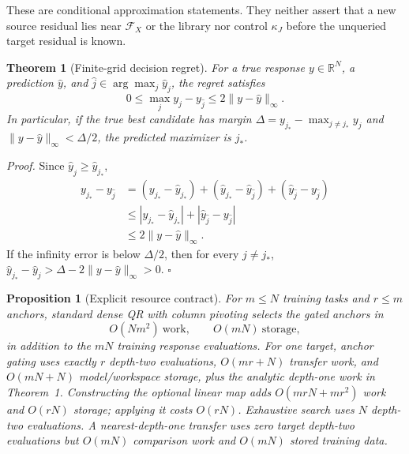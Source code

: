 \documentclass[10pt,letterpaper,twoside]{article}
\newtheorem{theorem}{Theorem}
\newtheorem{proposition}{Proposition}
\newcommand{\RR}{\mathbb{R}}
\newcommand{\norm}[1]{\lVert#1\rVert}
\begin{document}
These are conditional approximation statements.  They neither assert that a
new source residual lies near $\mathcal F_X$ or the library nor control
$\kappa_J$ before the unqueried target residual is known.

\begin{theorem}[Finite-grid decision regret]
For a true response $y\in\RR^N$, a prediction $\widehat y$, and
$\widehat j\in\arg\max_j\widehat y_j$, the regret satisfies
\begin{equation}
0\le \max_j y_j-y_{\widehat j}
\le2\norm{y-\widehat y}_\infty.
\label{eq:regret}
\end{equation}
In particular, if the true best candidate has margin
$\Delta=y_{j_*}-\max_{j\ne j_*}y_j$ and
$\norm{y-\widehat y}_\infty<\Delta/2$, the predicted maximizer is $j_*$.
\end{theorem}

\noindent\textit{Proof.}
Since $\widehat y_{\widehat j}\ge\widehat y_{j_*}$,
\begin{align}
y_{j_*}-y_{\widehat j}
&=(y_{j_*}-\widehat y_{j_*})
+(\widehat y_{j_*}-\widehat y_{\widehat j})
+(\widehat y_{\widehat j}-y_{\widehat j})\\
&\le |y_{j_*}-\widehat y_{j_*}|
+|\widehat y_{\widehat j}-y_{\widehat j}|\\
&\le2\norm{y-\widehat y}_\infty.
\end{align}
If the infinity error is below $\Delta/2$, then for every $j\ne j_*$,
$\widehat y_{j_*}-\widehat y_j>\Delta-2\norm{y-\widehat y}_\infty>0$.
\hfill$\square$

\begin{proposition}[Explicit resource contract]
\label{prop:resources}
For $m\le N$ training tasks and $r\le m$ anchors, standard dense QR with
column pivoting selects the gated anchors in
\begin{equation}
O(Nm^2)\ \text{work},\qquad O(mN)\ \text{storage},
\label{eq:offline}
\end{equation}
in addition to the $mN$ training response evaluations.  For one target,
anchor gating uses exactly $r$ depth-two evaluations, $O(mr+N)$ transfer work,
and $O(mN+N)$ model/workspace storage, plus the analytic depth-one work in
Theorem~1.  Constructing the optional linear map adds
$O(mrN+mr^2)$ work and $O(rN)$ storage; applying it costs $O(rN)$.
Exhaustive search uses $N$ depth-two evaluations.  A nearest-depth-one
transfer uses zero target depth-two evaluations but $O(mN)$ comparison work
and $O(mN)$ stored training data.
\end{proposition}
\end{document}

